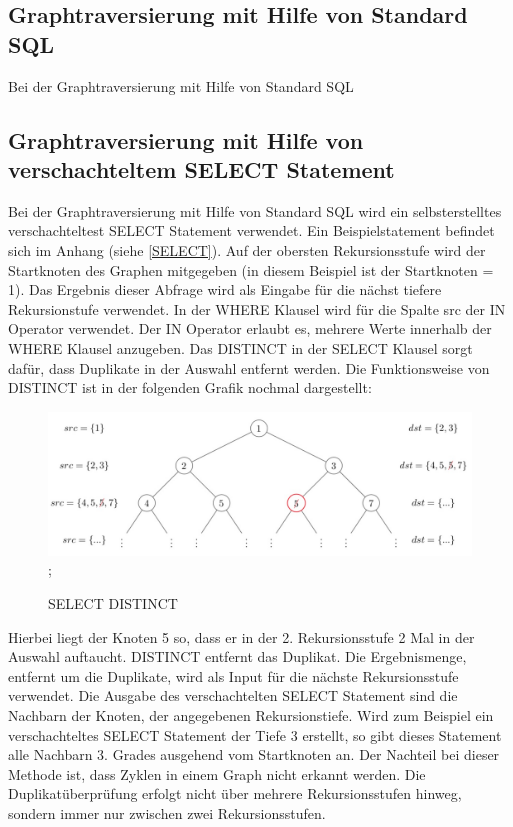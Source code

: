 \subsection{Graphtraversierung mit Hilfe von Standard SQL}
Bei der Graphtraversierung mit Hilfe von Standard SQL
\subsection{Graphtraversierung mit Hilfe von verschachteltem SELECT Statement}
Bei der Graphtraversierung mit Hilfe von Standard SQL wird ein selbsterstelltes verschachteltest SELECT Statement verwendet. Ein Beispielstatement befindet sich im Anhang (siehe \ref{SELECT}).
Auf der obersten Rekursionsstufe wird der Startknoten des Graphen mitgegeben (in diesem Beispiel ist der Startknoten = 1). Das Ergebnis dieser Abfrage wird als Eingabe
für die nächst tiefere Rekursionstufe verwendet. In der WHERE Klausel wird für die Spalte src der IN Operator verwendet. Der IN Operator erlaubt es, mehrere Werte innerhalb
der WHERE Klausel anzugeben. Das DISTINCT in der SELECT Klausel sorgt dafür, dass Duplikate in der Auswahl entfernt werden. Die Funktionsweise von DISTINCT ist in der folgenden
Grafik nochmal dargestellt:
\begin{figure}[H]
    \includegraphics[width = \linewidth]{images/Distinct.jpg};
    \caption{SELECT DISTINCT}
\end{figure}
Hierbei liegt der Knoten 5 so, dass er in der 2. Rekursionsstufe 2 Mal in der Auswahl auftaucht. DISTINCT entfernt das Duplikat. Die Ergebnismenge, entfernt um die
Duplikate, wird als Input für die nächste Rekursionsstufe verwendet.
Die Ausgabe des verschachtelten SELECT Statement sind die Nachbarn der Knoten, der angegebenen Rekursionstiefe. Wird zum Beispiel ein
verschachteltes SELECT Statement der Tiefe 3 erstellt, so gibt dieses Statement alle Nachbarn 3. Grades ausgehend vom Startknoten an. Der Nachteil bei dieser Methode ist, dass
Zyklen in einem Graph nicht erkannt werden. Die Duplikatüberprüfung erfolgt nicht über mehrere Rekursionsstufen hinweg, sondern immer nur zwischen zwei Rekursionsstufen.

